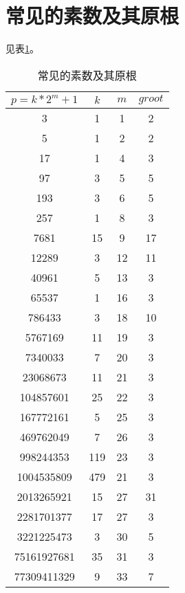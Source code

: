 \section{常见的素数及其原根}
见表\ref{tab:ntt-primes}。
\begin{table}[!htbp]
\centering
\caption{常见的素数及其原根 \label{tab:ntt-primes}}
\begin{tabular}{|c|c|c|c|}
\hline
$p=k*2^m + 1$         & $k$   & $m$  & $groot$ \\ \hline
3                   & 1   & 1  & 2     \\ \hline
5                   & 1   & 2  & 2     \\ \hline
17                  & 1   & 4  & 3     \\ \hline
97                  & 3   & 5  & 5     \\ \hline
193                 & 3   & 6  & 5     \\ \hline
257                 & 1   & 8  & 3     \\ \hline
7681                & 15  & 9  & 17    \\ \hline
12289               & 3   & 12 & 11    \\ \hline
40961               & 5   & 13 & 3     \\ \hline
65537               & 1   & 16 & 3     \\ \hline
786433              & 3   & 18 & 10    \\ \hline
5767169             & 11  & 19 & 3     \\ \hline
7340033             & 7   & 20 & 3     \\ \hline
23068673            & 11  & 21 & 3     \\ \hline
104857601           & 25  & 22 & 3     \\ \hline
167772161           & 5   & 25 & 3     \\ \hline
469762049           & 7   & 26 & 3     \\ \hline
{ \color{red}998244353}           & 119 & 23 & 3     \\ \hline
{\color{red}1004535809}          & 479 & 21 & 3     \\ \hline
2013265921          & 15  & 27 & 31    \\ \hline
{\color{red}2281701377}          & 17  & 27 & 3     \\ \hline
3221225473          & 3   & 30 & 5     \\ \hline
75161927681         & 35  & 31 & 3     \\ \hline
77309411329         & 9   & 33 & 7     \\ \hline

\end{tabular}
\end{table}
